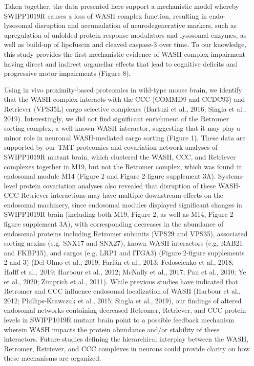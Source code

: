 
Taken together, the data presented here support a mechanistic model whereby
SWIPP1019R causes a loss of WASH complex function, resulting in endo-lysosomal
disruption and accumulation of neurodegenerative markers, such as upregulation
of unfolded protein response modulators and lysosomal enzymes, as well as
build-up of lipofuscin and cleaved caspase-3 over time. To our knowledge, this
study provides the first mechanistic evidence of WASH complex impairment having
direct and indirect organellar effects that lead to cognitive deficits and
progressive motor impairments (Figure 8).

Using in vivo proximity-based proteomics in wild-type mouse brain, we identify
that the WASH complex interacts with the CCC (COMMD9 and CCDC93) and Retriever
(VPS35L) cargo selective complexes (Bartuzi et al., 2016; Singla et al., 2019).
Interestingly, we did not find significant enrichment of the Retromer sorting
complex, a well-known WASH interactor, suggesting that it may play a minor role
in neuronal WASH-mediated cargo sorting (Figure 1). These data are supported by
our TMT proteomics and covariation network analyses of SWIPP1019R mutant brain,
which clustered the WASH, CCC, and Retriever complexes together in M19, but not
the Retromer complex, which was found in endosomal module M14 (Figure 2 and
Figure 2-figure supplement 3A). Systems-level protein covariation analyses also
revealed that disruption of these WASH-CCC-Retriever interactions may have
multiple downstream effects on the endosomal machinery, since endosomal modules
displayed significant changes in SWIPP1019R brain (including both M19, Figure 2,
as well as M14, Figure 2-figure supplement 3A), with corresponding decreases in
the abundance of endosomal proteins including Retromer subunits (VPS29 and
VPS35), associated sorting nexins (e.g. SNX17 and SNX27), known WASH interactors
(e.g. RAB21 and FKBP15), and cargos (e.g. LRP1 and ITGA3) (Figure 2-figure
supplements 2 and 3) (Del Olmo et al., 2019; Farfán et al., 2013; Fedoseienko et
al., 2018; Halff et al., 2019; Harbour et al., 2012; McNally et al., 2017; Pan
et al., 2010; Ye et al., 2020; Zimprich et al., 2011). While previous studies
have indicated that Retromer and CCC influence endosomal localization of WASH
(Harbour et al., 2012; Phillips-Krawczak et al., 2015; Singla et al., 2019), our
findings of altered endosomal networks containing decreased Retromer, Retriever,
and CCC protein levels in SWIPP1019R mutant brain point to a possible feedback
mechanism wherein WASH impacts the protein abundance and/or stability of these
interactors. Future studies defining the hierarchical interplay between the
WASH, Retromer, Retriever, and CCC complexes in neurons could provide clarity on
how these mechanisms are organized.

